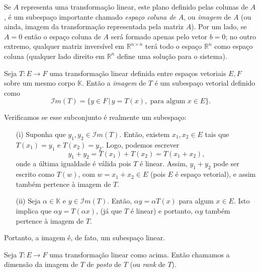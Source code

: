 Se $A$ representa uma transformação linear, este plano definido pelas colunas de $A$, é um subespaço importante chamado \emph{espaço coluna de $A$}, ou \emph{imagem} de $A$ (ou ainda, imagem da transformação representada pela matriz $A$). Por um lado, se $A=0$ então o espaço coluna de $A$ será formado apenas pelo vetor $b=0$; no outro extremo, qualquer matriz inversível em ${\mathbb{R}}^{n\times n}$ terá todo o espaço ${\mathbb{R}}^n$ como espaço coluna (qualquer lado direito em ${\mathbb{R}}^n$ define uma solução para o sistema).

\begin{defi}
	Seja $T:E\to F$ uma transformação linear definida entre espaços vetoriais $E,F$ sobre um mesmo corpo ${\mathbb{K}}$. Então a \emph{imagem} de $T$ é um subespaço vetorial definido como
    \begin{equation*}
	    {\mathcal{I}}m(T) = \{ y \in F \,|\, y=T(x), \text{ para algum } x\in E\}.
    \end{equation*}
\end{defi}

Verificamos se esse subconjunto é realmente um subespaço:

\begin{itemize}
\item[(i)] Suponha que $y_1, y_2\in {\mathcal{I}}m(T)$. Então, existem $x_1, x_2 \in E$ tais que $T(x_1)=y_1$ e $T(x_2) = y_2$. Logo, podemos escrever 
  \begin{equation*}
    y_1 + y_2 = T(x_1) + T(x_2) = T(x_1+x_2),
  \end{equation*}
  onde a última igualdade é válida pois $T$ é linear. Assim, $y_1+y_2$ pode ser escrito como $T(w)$, com $w = x_1+x_2 \in E$ (pois $E$ é espaço vetorial), e assim também pertence à imagem de $T$.
\item[(ii)] Seja $\alpha \in {\mathbb{K}}$ e $y \in {\mathcal{I}}m(T)$. Então, $\alpha y = \alpha T(x)$ para algum $x\in E$. Isto implica que $\alpha y = T(\alpha x)$, (já que $T$ é linear) e portanto, $\alpha y$ também pertence à imagem de $T$.
\end{itemize}

Portanto, a imagem é, de fato, um subespaço linear. 

\begin{defi}
	Seja $T:E\to F$ uma transformação linear como acima. Então chamamos a dimensão da imagem de $T$ de \emph{posto} de $T$ (ou \emph{rank} de $T$).
\end{defi}

